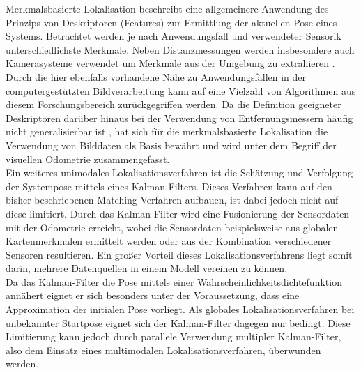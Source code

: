 Merkmalsbasierte Lokalisation beschreibt eine allgemeinere Anwendung des Prinzips von Deskriptoren (Features) zur Ermittlung der aktuellen Pose eines Systems. Betrachtet werden je nach Anwendungsfall und verwendeter Sensorik unterschiedlichste Merkmale. Neben Distanzmessungen \cite{Tomono2004} werden insbesondere auch Kamerasysteme verwendet um Merkmale aus der Umgebung zu extrahieren \cite{Se2001}. Durch die hier ebenfalls vorhandene Nähe zu Anwendungsfällen in der computergestützten Bildverarbeitung kann auf eine Vielzahl von Algorithmen aus diesem Forschungsbereich zurückgegriffen werden. Da die Definition geeigneter Deskriptoren darüber hinaus bei der Verwendung von Entfernungsmessern häufig nicht generalisierbar ist \red[belegen!?], hat sich für die merkmalsbasierte Lokalisation die Verwendung von Bilddaten als Basis bewährt und wird unter dem Begriff der visuellen Odometrie \cite{Mccarthy2003} zusammengefasst.\\

Ein weiteres unimodales Lokalisationsverfahren ist die Schätzung und Verfolgung der Systempose mittels eines Kalman-Filters. Dieses Verfahren kann auf den bisher beschriebenen Matching Verfahren aufbauen, ist dabei jedoch nicht auf diese limitiert. Durch das Kalman-Filter wird eine Fusionierung der Sensordaten mit der Odometrie  erreicht, wobei die Sensordaten beispielsweise aus globalen Kartenmerkmalen ermittelt werden \cite{Leonard1991} oder aus der Kombination verschiedener Sensoren \cite{Roumeliotis1997} resultieren. Ein großer Vorteil dieses Lokalisationsverfahrens liegt somit darin, mehrere Datenquellen in einem Modell vereinen zu können.\\ Da das Kalman-Filter die Pose mittels einer Wahrscheinlichkeitsdichtefunktion annähert eignet er sich besonders unter der Voraussetzung, dass eine Approximation der initialen Pose vorliegt. Als globales Lokalisationsverfahren bei unbekannter Startpose eignet sich der Kalman-Filter dagegen nur bedingt. Diese Limitierung kann jedoch durch parallele Verwendung multipler Kalman-Filter, also dem Einsatz eines multimodalen Lokalisationsverfahren, überwunden werden.
